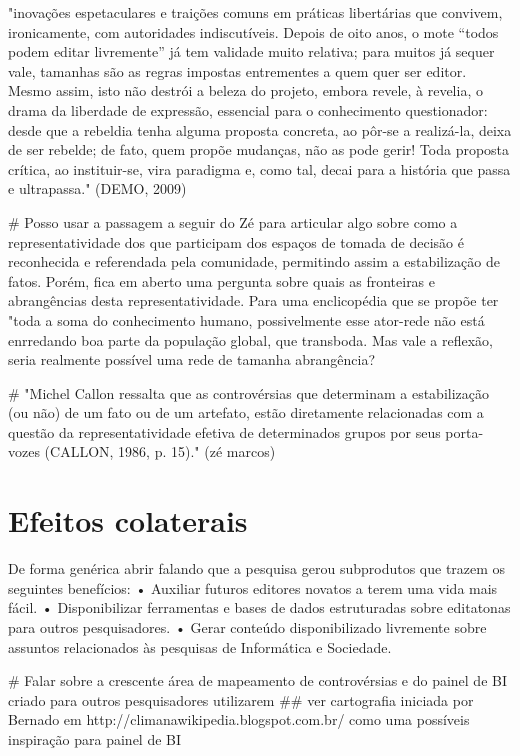 "inovações espetaculares e traições comuns em práticas libertárias que convivem, ironicamente, com autoridades indiscutíveis. Depois de oito anos, o mote “todos podem editar livremente” já tem validade muito relativa; para muitos já sequer vale, tamanhas são as regras impostas entrementes a quem quer ser editor. Mesmo assim, isto não destrói a beleza do projeto, embora revele, à revelia, o drama da liberdade de expressão, essencial para o conhecimento questionador: desde que a rebeldia tenha alguma proposta concreta, ao pôr-se a realizá-la, deixa de ser rebelde; de fato, quem propõe mudanças, não as pode gerir! Toda proposta crítica, ao instituir-se, vira paradigma e, como tal, decai para a história que passa e ultrapassa." (DEMO, 2009)

# Posso usar a passagem a seguir do Zé para articular algo sobre como a representatividade dos que participam dos espaços de tomada de decisão é reconhecida e referendada pela comunidade, permitindo assim a estabilização de fatos. Porém, fica em aberto uma pergunta sobre quais as fronteiras e abrangências desta representatividade. Para uma enclicopédia que se propõe ter "toda a soma do conhecimento humano, possivelmente esse ator-rede não está enrredando boa parte da população global, que transboda. Mas vale a reflexão, seria realmente possível uma rede de tamanha abrangência?

# "Michel Callon ressalta que as controvérsias que determinam a estabilização (ou não) de um fato ou de um artefato, estão diretamente relacionadas com a questão da representatividade efetiva de determinados grupos por seus porta-vozes (CALLON, 1986, p. 15)." (zé marcos)

\section{Efeitos colaterais}

De forma genérica abrir falando que a pesquisa gerou subprodutos que trazem os seguintes benefícios:
    • Auxiliar futuros editores novatos a terem uma vida mais fácil.
    • Disponibilizar ferramentas e bases de dados estruturadas sobre editatonas para outros pesquisadores.
    • Gerar conteúdo disponibilizado livremente sobre assuntos relacionados às pesquisas de Informática e Sociedade.
    
# Falar sobre a crescente área de mapeamento de controvérsias e do painel de BI criado para outros pesquisadores utilizarem
## ver cartografia iniciada por Bernado em
http://climanawikipedia.blogspot.com.br/ como uma possíveis inspiração para painel de BI


